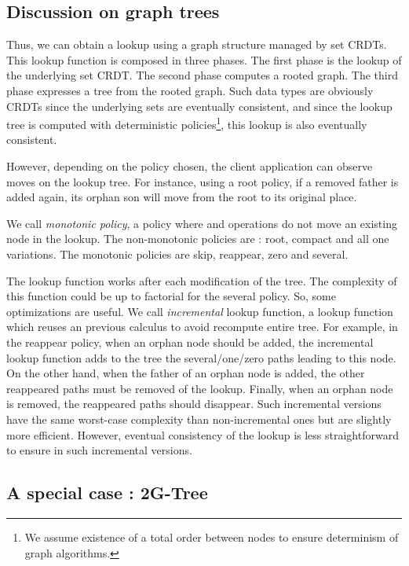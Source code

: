 \documentclass[a4paper]{article}
\begin{document}
\subsection{Discussion on graph trees}

Thus, we can obtain a lookup using a graph structure managed by set
CRDTs. This lookup function is composed in three phases. The first
phase is the lookup of the underlying set CRDT. The second phase
computes a rooted graph. The third phase expresses a tree from the
rooted graph. Such data types are obviously CRDTs since the underlying
sets are eventually consistent, and since the lookup tree is computed
with deterministic policies\footnote{We assume existence of a total
  order between nodes to ensure determinism of graph algorithms.},
this lookup is also eventually consistent.

However, depending on the policy chosen, the client application can
observe moves on the lookup tree. For instance, using a root policy,
if a removed father is added again, its orphan son will move from the
root to its original place. 

We call {\em monotonic policy}, a policy where  and 
operations do not move an existing node in the lookup. The
non-monotonic policies are : root, compact and all one variations. The
monotonic policies are skip, reappear, zero and several.


The lookup function works after each modification of the tree.  The
complexity of this function could be up to factorial for the several
policy. So, some optimizations are useful.  We call {\em incremental}
lookup function, a lookup function which reuses an previous calculus
to avoid recompute entire tree.  For example, in the reappear policy,
when an orphan node should be added, the incremental lookup function
adds to the tree the several/one/zero paths leading to this node.  On
the other hand, when the father of an orphan node is added, the other
reappeared paths must be removed of the lookup. Finally, when an
orphan node is removed, the reappeared paths should disappear. Such
incremental versions have the same worst-case complexity than
non-incremental ones but are slightly more efficient. However,
eventual consistency of the lookup is less straightforward to ensure
in such incremental versions.








\subsection{A special case : 2G-Tree} 
\label{sec:2G}
\end{document}
